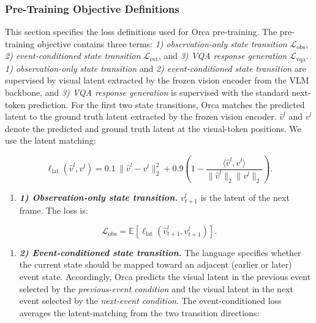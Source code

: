 \documentclass{llmxive}
\begin{document}
\subsubsection{Pre-Training Objective Definitions}
\label{sec:appendix_pretraining_objective}
This section specifies the loss definitions used for Orca pre-training. The pre-training objective contains three terms: \textit{1) observation-only state transition} \(\mathcal{L}_{\mathrm{obs}}\), \textit{2) event-conditioned state transition} \(\mathcal{L}_{\mathrm{evt}}\), and \textit{3) VQA response generation} \(\mathcal{L}_{\mathrm{vqa}}\). 
\textit{1) observation-only state transition} and \textit{2) event-conditioned state transition} are supervised by visual latent extracted by the frozen vision encoder from the VLM backbone, and \textit{3) VQA response generation} is supervised with the standard next-token prediction. For the first two state transitions, Orca matches the predicted latent to the ground truth latent extracted by the frozen vision encoder. \(\hat{v}^l\) and \(v^l\) denote the predicted and ground truth latent at the visual-token positions. We use the latent matching: 

\vspace{-2ex}
\begin{equation}\label{eq:appendix_latent_matching} 
\ell_{\mathrm{lat}}(\hat{v}^l,v^l) = 0.1\,\|\hat{v}^l-v^l\|_2^2 + 0.9 \left( 1- \frac{\langle \hat{v}^l, v^l\rangle} {\|\hat{v}^l\|_2\|v^l\|_2} \right). 
\end{equation}

\begin{enumerate}[
    leftmargin=1.35em,
    itemsep=0.35em,
    topsep=0.35em,
    parsep=0em
]
    \item[] \textit{\textbf{1) Observation-only state transition.}} \(v^l_{t+1}\) is the latent of the next frame. The loss is:
\end{enumerate}


\begin{equation} 
\mathcal{L}_{\mathrm{obs}} = \mathbb{E} \left[ \ell_{\mathrm{lat}} \left( \hat{v}^l_{t+1}, v^l_{t+1} \right) \right]. \label{eq:appendix_obs_loss} 
\end{equation}

\vspace{-2ex}
\begin{enumerate}[
    leftmargin=1.35em,
    itemsep=0.35em,
    topsep=0.35em,
    parsep=0em
]
    \item[] \textit{\textbf{2) Event-conditioned state transition.}} The language specifies whether the current state should be mapped toward an adjacent (earlier or later) event state. Accordingly, Orca predicts the visual latent in the previous event selected by the \textit{previous-event condition} and the visual latent in the next event selected by the \textit{next-event condition}. The event-conditioned loss averages the latent-matching from the two transition directions:
\end{enumerate}
\end{document}
